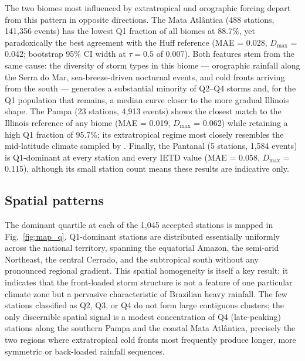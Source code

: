 \documentclass[a4paper,fleqn]{cas-sc}
\begin{document}
The two biomes most influenced by extratropical and orographic
forcing depart from this pattern in opposite directions. The Mata
Atlântica (488 stations, 141,356 events) has the lowest Q1 fraction
of all biomes at 88.7\%, yet paradoxically the best agreement with
the Huff reference (MAE = 0.028, $D_\mathrm{max}$ = 0.042; bootstrap
95\% CI width at $\tau = 0.5$ of 0.007). Both features stem from the
same cause: the diversity of storm types in this biome — orographic
rainfall along the Serra do Mar, sea-breeze-driven nocturnal events,
and cold fronts arriving from the south — generates a substantial
minority of Q2–Q4 storms and, for the Q1 population that remains, a
median curve closer to the more gradual Illinois shape. The Pampa
(23 stations, 4,913 events) shows the closest match to the Illinois
reference of any biome (MAE = 0.019, $D_\mathrm{max}$ = 0.062) while
retaining a high Q1 fraction of 95.7\%; its extratropical regime most
closely resembles the mid-latitude climate sampled by \citet{Huff1967}.
Finally, the Pantanal (5 stations, 1,584 events) is Q1-dominant at
every station and every IETD value (MAE = 0.058, $D_\mathrm{max}$ =
0.115), although its small station count means these results are
indicative only.

\subsection{Spatial patterns}
\label{sec:maps}

The dominant quartile at each of the 1,045 accepted stations is mapped
in Fig.~\ref{fig:map_q}. Q1-dominant stations are distributed
essentially uniformly across the national territory, spanning the
equatorial Amazon, the semi-arid Northeast, the central Cerrado, and
the subtropical south without any pronounced regional gradient. This
spatial homogeneity is itself a key result: it indicates that the
front-loaded storm structure is not a feature of one particular
climate zone but a pervasive characteristic of Brazilian heavy
rainfall. The few stations classified as Q2, Q3, or Q4 do not form
large contiguous clusters; the only discernible spatial signal is a
modest concentration of Q4 (late-peaking) stations along the southern
Pampa and the coastal Mata Atlântica, precisely the two regions where
extratropical cold fronts most frequently produce longer, more
symmetric or back-loaded rainfall sequences.
\end{document}
